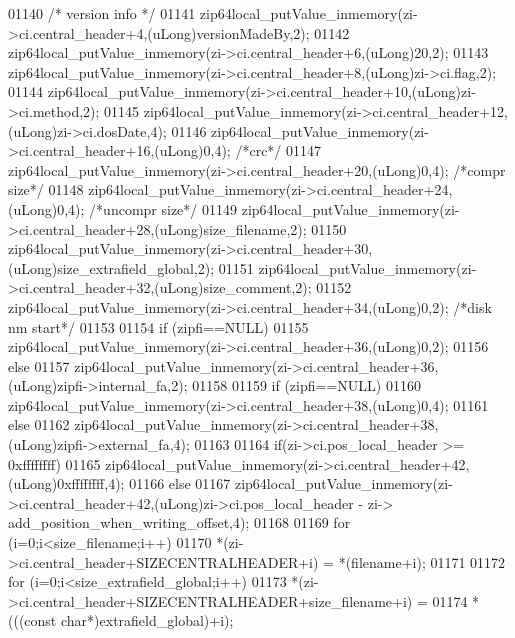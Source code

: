 \begin{DoxyCode}
01140     \textcolor{comment}{/* version info */}
01141     zip64local\_putValue\_inmemory(zi->ci.central\_header+4,(uLong)versionMadeBy,2);
01142     zip64local\_putValue\_inmemory(zi->ci.central\_header+6,(uLong)20,2);
01143     zip64local\_putValue\_inmemory(zi->ci.central\_header+8,(uLong)zi->ci.flag,2);
01144     zip64local\_putValue\_inmemory(zi->ci.central\_header+10,(uLong)zi->ci.method,2);
01145     zip64local\_putValue\_inmemory(zi->ci.central\_header+12,(uLong)zi->ci.dosDate,4);
01146     zip64local\_putValue\_inmemory(zi->ci.central\_header+16,(uLong)0,4); \textcolor{comment}{/*crc*/}
01147     zip64local\_putValue\_inmemory(zi->ci.central\_header+20,(uLong)0,4); \textcolor{comment}{/*compr size*/}
01148     zip64local\_putValue\_inmemory(zi->ci.central\_header+24,(uLong)0,4); \textcolor{comment}{/*uncompr size*/}
01149     zip64local\_putValue\_inmemory(zi->ci.central\_header+28,(uLong)size\_filename,2);
01150     zip64local\_putValue\_inmemory(zi->ci.central\_header+30,(uLong)size\_extrafield\_global,2);
01151     zip64local\_putValue\_inmemory(zi->ci.central\_header+32,(uLong)size\_comment,2);
01152     zip64local\_putValue\_inmemory(zi->ci.central\_header+34,(uLong)0,2); \textcolor{comment}{/*disk nm start*/}
01153 
01154     \textcolor{keywordflow}{if} (zipfi==NULL)
01155         zip64local\_putValue\_inmemory(zi->ci.central\_header+36,(uLong)0,2);
01156     \textcolor{keywordflow}{else}
01157         zip64local\_putValue\_inmemory(zi->ci.central\_header+36,(uLong)zipfi->internal\_fa,2);
01158 
01159     \textcolor{keywordflow}{if} (zipfi==NULL)
01160         zip64local\_putValue\_inmemory(zi->ci.central\_header+38,(uLong)0,4);
01161     \textcolor{keywordflow}{else}
01162         zip64local\_putValue\_inmemory(zi->ci.central\_header+38,(uLong)zipfi->external\_fa,4);
01163 
01164     \textcolor{keywordflow}{if}(zi->ci.pos\_local\_header >= 0xffffffff)
01165       zip64local\_putValue\_inmemory(zi->ci.central\_header+42,(uLong)0xffffffff,4);
01166     \textcolor{keywordflow}{else}
01167       zip64local\_putValue\_inmemory(zi->ci.central\_header+42,(uLong)zi->ci.pos\_local\_header - zi->
      add\_position\_when\_writing\_offset,4);
01168 
01169     \textcolor{keywordflow}{for} (i=0;i<size\_filename;i++)
01170         *(zi->ci.central\_header+SIZECENTRALHEADER+i) = *(filename+i);
01171 
01172     \textcolor{keywordflow}{for} (i=0;i<size\_extrafield\_global;i++)
01173         *(zi->ci.central\_header+SIZECENTRALHEADER+size\_filename+i) =
01174               *(((\textcolor{keyword}{const} \textcolor{keywordtype}{char}*)extrafield\_global)+i);

\end{DoxyCode}
